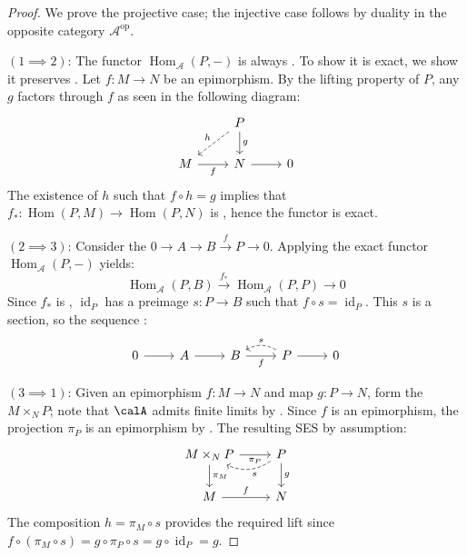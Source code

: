 \begin{proof}
    We prove the projective case; the injective case follows by duality in the opposite category $\mathcal{A}^{\operatorname{op}}$.

    $(1 \implies 2)$: The functor $\operatorname{Hom}_{\mathcal{A}}(P, -)$ is always . To show it is exact, we show it preserves . Let $f: M \to N$ be an epimorphism. By the lifting property of $P$, any $g$ factors through $f$ as seen in the following diagram:
    \[
    \begin{tikzcd}
        & P \arrow[d, "g"] \arrow[dl, dashed, "h"'] \\
        M \arrow[r, "f"'] & N \arrow[r] & 0
    \end{tikzcd}
    \]
    The existence of $h$ such that $f \circ h = g$ implies that $f_*: \operatorname{Hom}(P, M) \to \operatorname{Hom}(P, N)$ is , hence the functor is exact.

    $(2 \implies 3)$: Consider the  $0 \to A \to B \xrightarrow{f} P \to 0$. Applying the exact functor $\operatorname{Hom}_{\mathcal{A}}(P, -)$ yields:
    \[
        \operatorname{Hom}_{\mathcal{A}}(P, B) \xrightarrow{f_*} \operatorname{Hom}_{\mathcal{A}}(P, P) \to 0
    \]
    Since $f_*$ is , $\operatorname{id}_P$ has a preimage $s: P \to B$ such that $f \circ s = \operatorname{id}_P$. This $s$ is a section, so the sequence :
    \[
    \begin{tikzcd}
        0 \arrow[r] & A \arrow[r] & B \arrow[r, "f"'] & P \arrow[r] \arrow[l, bend right, dashed, "s"'] & 0
    \end{tikzcd}
    \]

    $(3 \implies 1)$: Given an epimorphism $f: M \to N$ and map $g: P \to N$, form the  $M \times_N P$; note that $\calA$ admits finite limits by . Since $f$ is an epimorphism, the projection $\pi_P$ is an epimorphism by . The resulting SES  by assumption:
    \[
    \begin{tikzcd}
        M \times_N P \arrow[r, "\pi_P"'] \arrow[d, "\pi_M"] & P \arrow[d, "g"] \arrow[l, bend left, dashed, "s"] \\
        M \arrow[r, "f"] & N
    \end{tikzcd}
    \]
    The composition $h = \pi_M \circ s$ provides the required lift since $f \circ (\pi_M \circ s) = g \circ \pi_P \circ s = g \circ \operatorname{id}_P = g$.
\end{proof}
